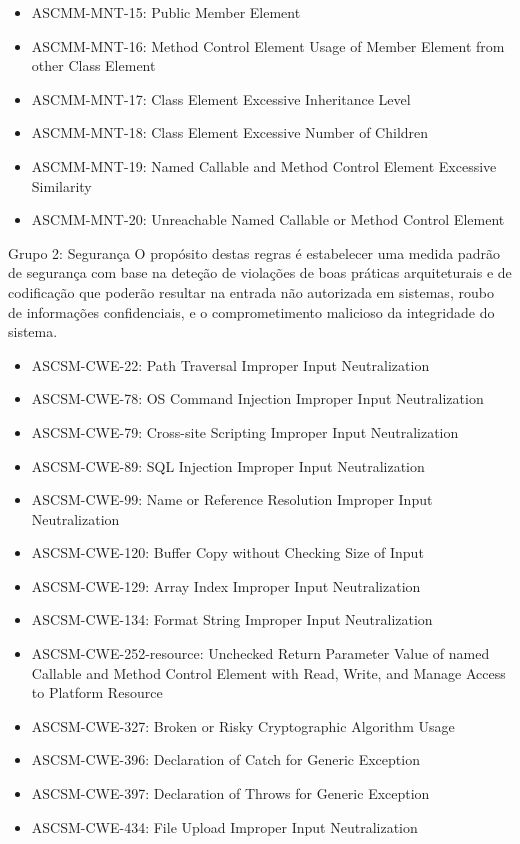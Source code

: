 \documentclass[openany,10pt,a4paper]{article}
\begin{document}
\begin{appendix}
\begin{itemize}
	\item ASCMM-MNT-15: Public Member Element	
	\item ASCMM-MNT-16: Method Control Element Usage of Member Element from other Class Element
	\item ASCMM-MNT-17: Class Element Excessive Inheritance Level
	\item ASCMM-MNT-18: Class Element Excessive Number of Children
	\item ASCMM-MNT-19: Named Callable and Method Control Element Excessive Similarity
	\item ASCMM-MNT-20: Unreachable Named Callable or Method Control Element
\end{itemize}
Grupo 2: Segurança
O propósito destas regras é estabelecer uma medida padrão de segurança com base na deteção de violações de boas práticas arquiteturais e de codificação que poderão resultar na entrada não autorizada em sistemas, roubo de informações confidenciais, e o comprometimento malicioso da integridade do sistema.
\begin{itemize}
	\setlength\itemsep{0em}
	\item ASCSM-CWE-22: Path Traversal Improper Input Neutralization
	\item ASCSM-CWE-78: OS Command Injection Improper Input Neutralization
	\item ASCSM-CWE-79: Cross-site Scripting Improper Input Neutralization
	\item ASCSM-CWE-89: SQL Injection Improper Input Neutralization
	\item ASCSM-CWE-99: Name or Reference Resolution Improper Input Neutralization
	\item ASCSM-CWE-120: Buffer Copy without Checking Size of Input
	\item ASCSM-CWE-129: Array Index Improper Input Neutralization
	\item ASCSM-CWE-134: Format String Improper Input Neutralization
	\item ASCSM-CWE-252-resource: Unchecked Return Parameter Value of named Callable and Method Control Element with Read, Write, and Manage Access to Platform Resource
	\item ASCSM-CWE-327: Broken or Risky Cryptographic Algorithm Usage
	\item ASCSM-CWE-396: Declaration of Catch for Generic Exception
	\item ASCSM-CWE-397: Declaration of Throws for Generic Exception
	\item ASCSM-CWE-434: File Upload Improper Input Neutralization

\end{itemize}
\end{appendix}
\end{document}

